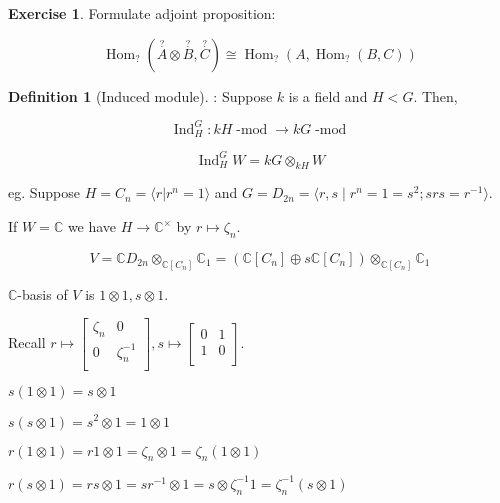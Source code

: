 \documentclass{article}
\theoremstyle{definition}
\newtheorem*{exercise}{Exercise}
\newtheorem*{definition}{Definition}
\newcommand{\Hom}{\operatorname{Hom}}
\begin{document}
\begin{exercise}
    Formulate adjoint proposition:

    \[
        \Hom_? (\overset{?}{A} \otimes \overset{?}{B} , \overset{?}{C}) \cong \Hom_? (A, \Hom_?(B,C))
    \]
\end{exercise}

\begin{definition}
    [Induced module]: Suppose \(k\) is a field and \(H < G\). Then,

    \[
        \operatorname{Ind}_H^G : kH\operatorname{-mod} \to kG \operatorname{-mod}
    \]

    \[
        \operatorname{Ind}_H^G W = kG \otimes_{kH} W
    \]
\end{definition}

eg. Suppose \(H = C_n = \langle r |r^n = 1 \rangle \) and \(G = D_{2n} = \langle r,s \mid r^n = 1 = s^2; srs = r ^{-1} \rangle \). 

If \(W = \mathbb{C}\) we have \(H \to \mathbb{C} ^\times \) by \(r \mapsto \zeta_n\).

\[
    V = \mathbb{C} D_{2n} \otimes_{\mathbb{C} [C_n]} \mathbb{C}_1 = (\mathbb{C} [C_n] \oplus s \mathbb{C} [C_n]) \otimes_{\mathbb{C}[C_n]} \mathbb{C} _1
\]

\(\mathbb{C}\)-basis of \(V\) is \(1 \otimes 1, s \otimes 1\).

Recall \(r \mapsto \begin{bmatrix}
    \zeta_n &  0 \\
    0 &  \zeta_n ^{-1} \\
\end{bmatrix}, s \mapsto \begin{bmatrix}
    0 &  1 \\
    1 &  0 \\
\end{bmatrix}\).

\(s(1 \otimes 1) = s \otimes 1\)

\(s(s \otimes 1) = s^2 \otimes 1 = 1 \otimes 1\) 

\(r(1 \otimes 1) = r1 \otimes 1 = \zeta_n \otimes 1 = \zeta_n(1 \otimes 1)\) 

\(r(s \otimes 1) = rs \otimes 1 = s r ^{-1} \otimes 1 = s \otimes \zeta_n ^{-1} 1 = \zeta_n ^{-1} (s \otimes 1)\) 
\end{document}

